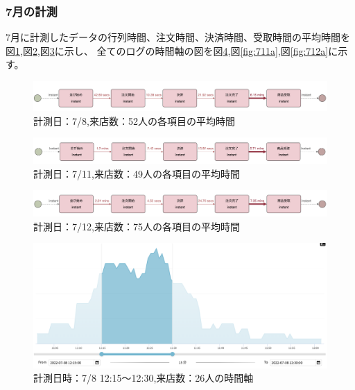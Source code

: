 \documentclass{jsarticle}
\begin{document}
\subsubsection{7月の計測}

7月に計測したデータの行列時間、注文時間、決済時間、受取時間の平均時間を
図\ref{fig:708},図\ref{fig:711},図\ref{fig:712}に示し、
全てのログの時間軸の図を図\ref{fig:708a},図\ref{fig:711a},図\ref{fig:712a}に示す。

\begin{figure}[H]
  \centering
  \includegraphics[width=15cm]{708.png}
  \caption{計測日：7/8,来店数：52人の各項目の平均時間}
  \label{fig:708}
\end{figure}

\begin{figure}[H]
  \centering
  \includegraphics[width=15cm]{711.png}
  \caption{計測日：7/11,来店数：49人の各項目の平均時間}
  \label{fig:711}
\end{figure}

\begin{figure}[H]
  \centering
  \includegraphics[width=15cm]{712.png}
  \caption{計測日：7/12,来店数：75人の各項目の平均時間}
  \label{fig:712}
\end{figure}



\begin{figure}[H]
  \centering
  \includegraphics[width=14cm]{708a.png}
  \caption{計測日時：7/8 12:15〜12:30,来店数：26人の時間軸}
  \label{fig:708a}
\end{figure}
\end{document}
